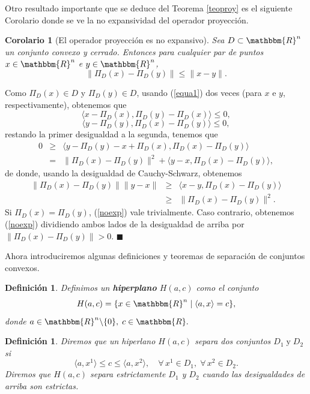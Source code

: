 \documentclass[a4paper,12pt]{report}
\newcommand{\la}{\langle}
\newcommand{\ra}{\rangle}
\newcommand{\RR}{\mathbbm{R}}
\newcommand{\Rn}{\RR^n}
\newtheorem{cor}[teo]{Corolario}
\newtheorem{defi}[teo]{Definici\'on}
\newenvironment{dem}{\vspace*{-0.1cm}{\it Demostraci\'on:}}{\hfill
$\blacksquare$\\}
\begin{document}
Otro resultado importante que se deduce del Teorema \ref{teoproy} es el siguiente Corolario donde se ve la no expansividad del operador proyecci\'on.


\begin{cor}[El operador proyecci\'on es no expansivo]
Sea $D\subset\Rn$ un conjunto convexo y cerrado.
Entonces para cualquier par de puntos $x\in\Rn$ e $y\in\Rn$,
\begin{equation}\label{noexp}
\|\Pi_{D}(x)-\Pi_{D}(y)\|\leq\|x-y\|.
\end{equation} 
\end{cor}


\begin{dem}
Como $\Pi_D(x)\in D$ y $\Pi_{D}(y)\in D$, usando (\ref{equa1}) dos veces (para $x$ e $y$, respectivamente), obtenemos que
$$\la x-\Pi_D(x),\Pi_{D}(y)-\Pi_D(x)\ra\leq 0,$$
$$\la y-\Pi_{D}(y),\Pi_D(x)-\Pi_{D}(y)\ra\leq 0,$$
restando la primer desigualdad a la segunda, tenemos que
\begin{eqnarray*}
0&\geq&\la y-\Pi_{D}(y)-x+\Pi_D(x),\Pi_D(x)-\Pi_{D}(y)\ra\\
&=&\|\Pi_D(x)-\Pi_{D}(y)\|^2+\la y-x,\Pi_D(x)-\Pi_{D}(y)\ra,
\end{eqnarray*}
de donde, usando la desigualdad de Cauchy-Schwarz, obtenemos
\begin{eqnarray*}
\|\Pi_D(x)-\Pi_{D}(y)\|\|y-x\|&\geq&\la x-y,\Pi_D(x)-\Pi_{D}(y)\ra\\
&\geq&\|\Pi_D(x)-\Pi_{D}(y)\|^2.
\end{eqnarray*}
Si $\Pi_D(x)=\Pi_{D}(y)$, (\ref{noexp}) vale trivialmente. Caso contrario, obtenemos (\ref{noexp}) dividiendo ambos lados de la desigualdad de arriba por $\|\Pi_D(x)-\Pi_{D}(y)\|>0$.
\end{dem}

Ahora introduciremos algunas definiciones y teoremas de separaci\'on de conjuntos convexos.

\begin{defi}
Definimos un \textbf{hiperplano} $H(a,c)$ como el conjunto
$$H(a,c)=\{x\in\Rn\mid\la a,x\ra=c\},$$
donde $a\in\Rn\backslash\{0\},\;c\in\RR.$
\end{defi}

\begin{defi}
Diremos que un hiperlano $H(a,c)$ separa dos conjuntos $D_1\;\mathrm{y}\;D_2$ si
$$\la a,x^1\ra\leq c\leq\la a,x^2\ra,\quad\forall\,x^1\in D_1,\;\forall\,x^2\in D_2.$$
Diremos que $H(a,c)$ separa estrictamente $D_1$ y $D_2$ cuando las desigualdades de arriba son estrictas.
\end{defi}
\end{document}
